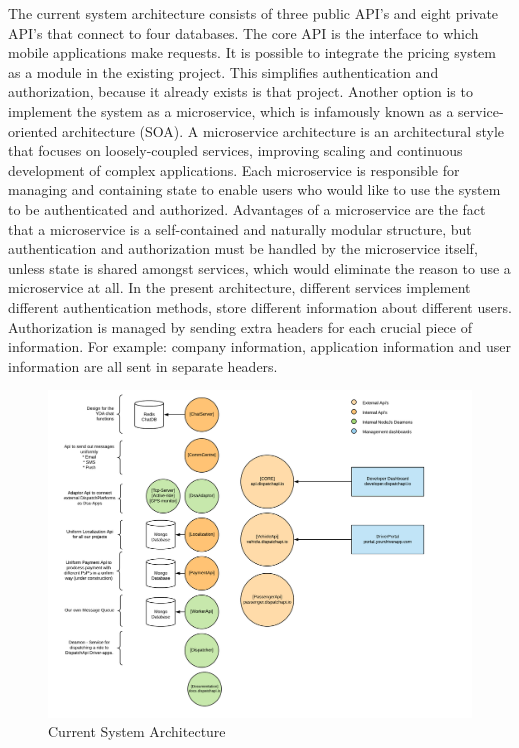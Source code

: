 The current system architecture consists of three public API's and eight private API's that connect to four databases.  The core API is the interface to which mobile applications make requests. It is possible to integrate the pricing system as a module in the existing project. This simplifies authentication and authorization, because it already exists is that project. Another option is to implement the system as a microservice, which is infamously known as a service-oriented architecture (SOA). A microservice architecture is an architectural style that focuses on loosely-coupled services, improving scaling and continuous development of complex applications. Each microservice is responsible for managing and containing state to enable users who would like to use the system to be authenticated and authorized. Advantages of a microservice are the fact that a microservice is a self-contained and naturally modular structure, but authentication and authorization must be handled by the microservice itself, unless state is shared amongst services, which would eliminate the reason to use a microservice at all. In the present architecture, different services implement different authentication methods, store different information about different users. Authorization is managed by sending extra headers for each crucial piece of information. For example: company information, application information and user information are all sent in separate headers.

\begin{figure}[ht!]
	\centering
	\includegraphics[width=1\textwidth]{Architecture}
	\caption[Architecture]{Current System Architecture}
	\label{fig:Architecture}
\end{figure}
\clearpage

